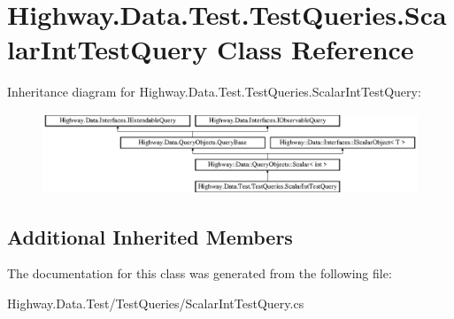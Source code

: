 \hypertarget{class_highway_1_1_data_1_1_test_1_1_test_queries_1_1_scalar_int_test_query}{\section{Highway.\-Data.\-Test.\-Test\-Queries.\-Scalar\-Int\-Test\-Query Class Reference}
\label{class_highway_1_1_data_1_1_test_1_1_test_queries_1_1_scalar_int_test_query}
}
Inheritance diagram for Highway.\-Data.\-Test.\-Test\-Queries.\-Scalar\-Int\-Test\-Query\-:\begin{figure}[H]
\begin{center}
\leavevmode
\includegraphics[height=2.400857cm]{class_highway_1_1_data_1_1_test_1_1_test_queries_1_1_scalar_int_test_query}
\end{center}
\end{figure}
\subsection*{Additional Inherited Members}


The documentation for this class was generated from the following file\-:\begin{DoxyCompactItemize}
\item 
Highway.\-Data.\-Test/\-Test\-Queries/Scalar\-Int\-Test\-Query.\-cs\end{DoxyCompactItemize}
